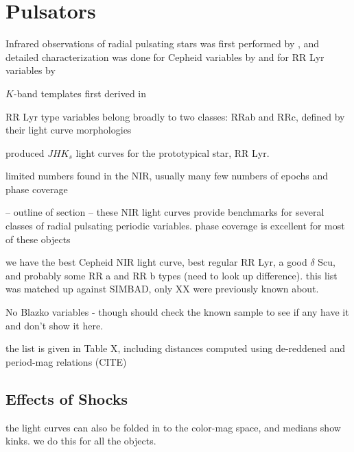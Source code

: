 \documentclass[]{emulateapj}
\begin{document}




\section{Pulsators}
Infrared observations of radial pulsating stars was first performed by \cite{wisniewski1968}, and detailed characterization was done for Cepheid variables by \cite{mcgonegal1982} and for RR Lyr variables by \cite{longmore1985}

$K$-band templates first derived in \citet{jones1996}

RR Lyr type variables belong broadly to two classes: RRab and RRc, defined by their light curve morphologies \citep{bailey1902}

\citet{sollima2008} produced $JHK_s$ light curves for the prototypical star, RR Lyr.

limited numbers found in the NIR, usually many few numbers of epochs and phase coverage \citep[e.g.][]{delprincipe2005}


-- outline of section --
these NIR light curves provide benchmarks for several classes of radial pulsating periodic variables. phase coverage is excellent for most of these objects

we have the best Cepheid NIR light curve, best regular RR Lyr, a good $\delta$ Scu, and probably some RR a and RR b types (need to look up difference). this list was matched up against SIMBAD, only XX were previously known about.

No Blazko variables - though should check the known sample to see if any have it and don't show it here.

the list is given in Table X, including distances computed using de-reddened and period-mag relations (CITE)

\subsection{Effects of Shocks}
the light curves can also be folded in to the color-mag space, and medians show kinks. we do this for all the objects.
\end{document}
